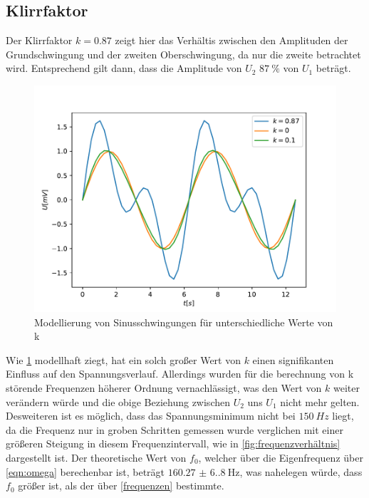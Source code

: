 \subsection{Klirrfaktor}
Der Klirrfaktor $k=0.87$ zeigt hier das Verhältis zwischen den Amplituden der Grundschwingung und der zweiten Oberschwingung,
da nur die zweite betrachtet wird.
Entsprechend gilt dann, dass die Amplitude von $U_2$ $\qty{87}{\percent}$ von $U_1$ beträgt.

\begin{figure}
    \centering
    \includegraphics{./Klirr_Model.pdf}
    \caption{Modellierung von Sinusschwingungen für unterschiedliche Werte von k}
    \label{fig:klirr_mod}
\end{figure}

Wie \ref{fig:klirr_mod} modellhaft ziegt, hat ein solch großer Wert von $k$ einen signifikanten Einfluss auf den Spannungsverlauf.
Allerdings wurden für die berechnung von k störende Frequenzen höherer Ordnung vernachlässigt, was den Wert von $k$ weiter
verändern würde und die obige Beziehung zwischen $U_2$ uns $U_1$ nicht mehr gelten. Desweiteren ist es möglich, dass 
das Spannungsminimum nicht bei $\qty{150}{Hz}$ liegt, da die Frequenz nur in groben Schritten gemessen wurde verglichen mit einer
größeren Steigung in diesem Frequenzintervall, wie in \ref{fig:frequenzverhältnis} dargestellt ist. Der theoretische Wert von
$f_0$, welcher über die Eigenfrequenz über \ref{eqn:omega} berechenbar ist, beträgt $\qty{160.27(6.80)}{\hertz}$, was nahelegen würde,
dass $f_0$ größer ist, als der über \ref{frequenzen} bestimmte.
